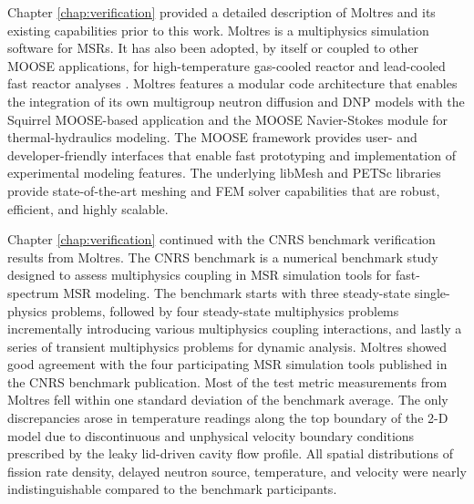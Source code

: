 Chapter \ref{chap:verification} provided a detailed description of Moltres and its existing
capabilities prior to this work. Moltres is a multiphysics simulation software for \glspl{MSR}. It
has also been adopted, by itself or coupled to other \gls{MOOSE} applications, for high-temperature
gas-cooled reactor and lead-cooled fast reactor analyses
\cite{fairhurst-agosta_multi-physics_2020, ji_numerical_2024}. Moltres features a modular code
architecture that enables the integration of its own multigroup neutron diffusion and \gls{DNP}
models with the Squirrel \gls{MOOSE}-based application \cite{noauthor_arfcsquirrel_nodate} and the
\gls{MOOSE} Navier-Stokes module \cite{peterson_overview_2018} for thermal-hydraulics modeling.
The \gls{MOOSE} framework provides user- and developer-friendly interfaces that enable fast
prototyping and implementation of experimental modeling features.
The underlying libMesh \cite{kirk_libmesh_2006} and PETSc \cite{satish_petsc_2019} libraries
provide state-of-the-art meshing and \gls{FEM} solver capabilities that are robust, efficient, and
highly scalable.

Chapter \ref{chap:verification} continued with the CNRS benchmark verification results from
Moltres. The CNRS benchmark \cite{tiberga_results_2020} is a numerical benchmark study
designed to assess multiphysics coupling in \gls{MSR} simulation tools for fast-spectrum
\gls{MSR} modeling. The benchmark starts with three steady-state single-physics problems, followed by four
steady-state multiphysics problems incrementally introducing various multiphysics coupling
interactions, and lastly a series of transient multiphysics problems for dynamic analysis. Moltres
showed good agreement with the four participating \gls{MSR} simulation tools published in the CNRS
benchmark publication. Most of the test metric measurements from Moltres fell within one standard
deviation of the benchmark average. The only discrepancies arose in temperature readings along the
top boundary of the 2-D model due to discontinuous and unphysical velocity boundary conditions
prescribed by the leaky lid-driven cavity flow profile. All spatial distributions of fission rate
density, delayed neutron source, temperature, and velocity were nearly indistinguishable compared
to the benchmark participants.


